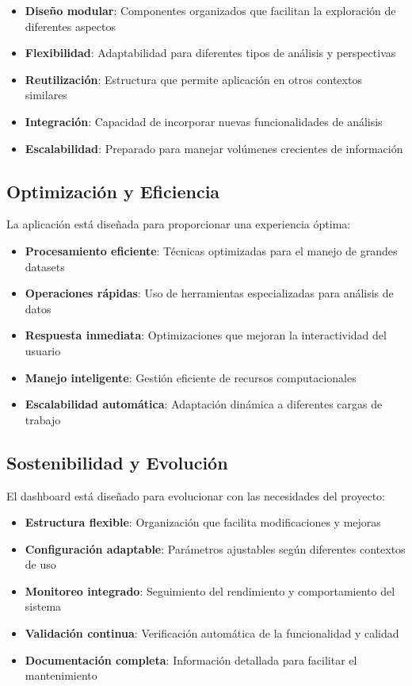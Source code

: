 \documentclass[12pt,a4paper,twoside,openany]{book}
\begin{document}
\begin{itemize}
    \item \textbf{Diseño modular}: Componentes organizados que facilitan la exploración de diferentes aspectos
    \item \textbf{Flexibilidad}: Adaptabilidad para diferentes tipos de análisis y perspectivas
    \item \textbf{Reutilización}: Estructura que permite aplicación en otros contextos similares
    \item \textbf{Integración}: Capacidad de incorporar nuevas funcionalidades de análisis
    \item \textbf{Escalabilidad}: Preparado para manejar volúmenes crecientes de información
\end{itemize}

\subsection{Optimización y Eficiencia}

La aplicación está diseñada para proporcionar una experiencia óptima:

\begin{itemize}
    \item \textbf{Procesamiento eficiente}: Técnicas optimizadas para el manejo de grandes datasets
    \item \textbf{Operaciones rápidas}: Uso de herramientas especializadas para análisis de datos
    \item \textbf{Respuesta inmediata}: Optimizaciones que mejoran la interactividad del usuario
    \item \textbf{Manejo inteligente}: Gestión eficiente de recursos computacionales
    \item \textbf{Escalabilidad automática}: Adaptación dinámica a diferentes cargas de trabajo
\end{itemize}

\subsection{Sostenibilidad y Evolución}

El dashboard está diseñado para evolucionar con las necesidades del proyecto:

\begin{itemize}
    \item \textbf{Estructura flexible}: Organización que facilita modificaciones y mejoras
    \item \textbf{Configuración adaptable}: Parámetros ajustables según diferentes contextos de uso
    \item \textbf{Monitoreo integrado}: Seguimiento del rendimiento y comportamiento del sistema
    \item \textbf{Validación continua}: Verificación automática de la funcionalidad y calidad
    \item \textbf{Documentación completa}: Información detallada para facilitar el mantenimiento
\end{itemize}
\end{document}
